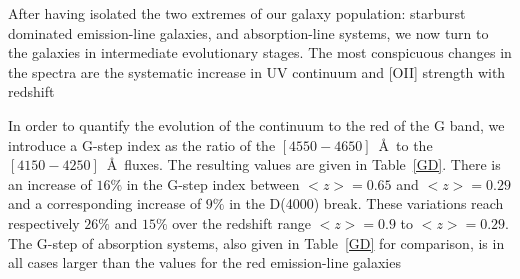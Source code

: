 \documentclass[referee]{aa}
\begin{document}
After having isolated the two extremes of our galaxy population: starburst dominated emission-line galaxies, and absorption-line systems, 
we now turn to the galaxies in intermediate evolutionary stages. 
The most conspicuous changes in the spectra are the systematic increase in UV continuum and [OII] strength with redshift \rm

In order to quantify the evolution of the continuum to the red of the G band, we introduce a G-step index as the ratio of the $[4550 - 4650]$~\AA\ to the  $[4150 - 4250]$~\AA\ fluxes. The resulting values are given in Table~\ref{GD}. There is an increase of $16 \%$ in the G-step
index between $<z>=0.65$ and $<z>=0.29$ and a corresponding increase of $9 \%$ in the D(4000) break.
These variations reach respectively $26 \%$ and $15 \%$ over the redshift range $<z> = 0.9$ to  $<z>=0.29$.
The G-step  of absorption systems, also given in  Table~\ref{GD} for comparison, is in all cases
larger than the values for the red emission-line galaxies
 
\end{document}
